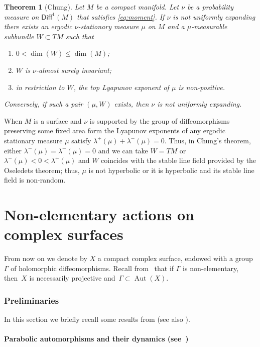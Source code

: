 \documentclass[JEP,XML,SOM,Unicode,published]{cedram}
\newenvironment{enumeratea}
{\bgroup\def\theenumi{\alph{enumi}}\begin{enumerate}}
{\end{enumerate}\egroup}
\DeclareMathOperator{\aut}{Aut}
\newcommand\Diff{{\mathsf{Diff}}}
\theoremstyle{plain}
\newtheorem{thm}{Theorem}[section]
\theoremstyle{definition}
\begin{document}
\begin{thm}[Chung] \label{thm:criterion_chung}
Let $M$ be a compact manifold. Let $\nu$ be a probability measure on $\Diff^1(M)$
that satisfies \eqref{eq:moment}. If $\nu$ is not uniformly expanding there exists an ergodic $\nu$-stationary measure $\mu$ on $M$ and a $\mu$-measurable
subbundle $W\subset TM$ such that
\begin{enumeratea}
\item\label{thm:criterion_chunga} $0<\dim(W)\leq \dim(M)$;
\item\label{thm:criterion_chungb} $W$ is $\nu$-almost surely invariant;
\item\label{thm:criterion_chungc} in restriction to $W$, the top Lyapunov exponent of $\mu$ is non-positive.
\end{enumeratea}
Conversely, if such a pair $(\mu, W)$ exists, then $\nu$ is not uniformly expanding.
\end{thm}

When $M$ is a surface and $\nu$ is supported by the group of diffeomorphisms preserving some fixed area form
the Lyapunov exponents of any ergodic stationary measure $\mu$ satisfy $\lambda^+(\mu)+\lambda^{-}(\mu)=0$. Thus,
in Chung's theorem, either $\lambda^{-}(\mu)=\lambda^{+}(\mu)=0$ and we can take $W=TM$ or $\lambda^{-}(\mu)<0<\lambda^+(\mu)$ and $W$ coincides with the stable line field
provided by the
Oseledets theorem; thus, $\mu$ is not hyperbolic or it is hyperbolic and its stable line field is non-random.\vspace*{-.5\baselineskip}

\part{Non-elementary actions on complex surfaces}

From now on we denote by $X$ a compact complex surface, endowed with a
group~$\Gamma$ of holomorphic
diffeomorphisms. Recall from~\cite{stiffness, Simons} that if $\Gamma$ is non-elementary, then~$X$ is necessarily projective and~$\Gamma\subset \aut(X)$.

\section{Preliminaries}\label{sec:preliminaries}

In this section we briefly recall some results from \cite{invariant} (see also \cite{cantat_groupes, Cantat:Milnor}).

\subsection{Parabolic automorphisms and their dynamics (see~\cite[\S 3]{invariant})} \label{subs:halphen}
\end{document}
